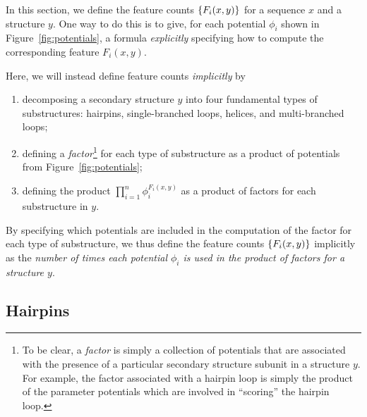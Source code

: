 \documentclass{article}
\begin{document}
  In this section, we define the feature counts ${\left\{{F_i(x,y)}\right\}}$ for a sequence
  $x$ and a structure $y$.  One way to do this is to give, for each potential $\phi_i$ shown
  in Figure~\ref{fig:potentials}, a formula \emph{explicitly} specifying how to compute the corresponding
  feature $F_i(x,y)$.

  Here, we will instead define feature counts \emph{implicitly} by
  \begin{enumerate}
  \item decomposing a secondary structure $y$ into four fundamental
    types of substructures: hairpins, single-branched loops, helices, and multi-branched loops;
  \item defining a \emph{factor}\footnote{
    To be clear, a \emph{factor} is simply a collection of potentials that are associated with
    the presence of a particular secondary structure subunit in a structure $y$.  For example,
    the factor associated with a hairpin loop is simply the product of the parameter potentials which
    are involved in ``scoring'' the hairpin loop.
  } for each type of substructure as a product of potentials from Figure~\ref{fig:potentials};
  \item defining the product $\prod_{i=1}^n \phi_i^{F_i(x,y)}$ as a product of factors for
    each substructure in $y$.
  \end{enumerate}
  By specifying which potentials are included in the computation of the factor for each type of
  substructure, we thus define the feature counts ${\left\{{F_i(x,y)}\right\}}$ implicitly as the \emph{number of times
  each potential $\phi_i$ is used in the product of factors for a structure $y$}.

  \subsection{Hairpins}
\end{document}
